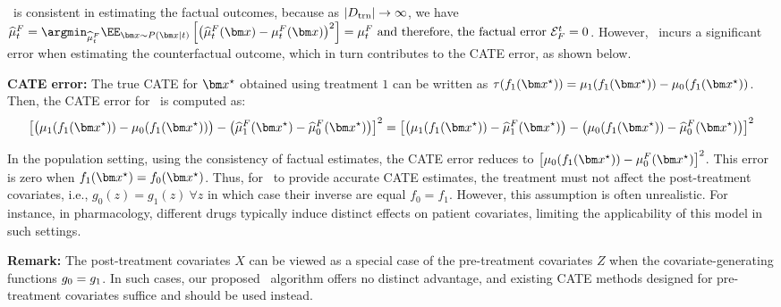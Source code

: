 \realonly\ is consistent in estimating the factual outcomes, because as $|D_{\text{trn}}| \to \infty$, we have
$
     \realmuhat_t^F = \argmin_{\realmuhat^F_t} \EE_{\xb \sim P(\xb|t)}\left[\left(\realmuhat^F_t(\xb) - \realmu^F_t(\xb)\right)^2\right] = \realmu_t^F \text{ and therefore, the factual error } \ErrF^t = 0
$.
However, \realonly\ incurs a significant error when estimating the counterfactual outcome, which in turn contributes to the CATE error, as shown below.



\textbf{CATE error:} The true CATE for $\xb^\star$ obtained using treatment $1$ can be written as $\tau(\RInv_1(\xb^\star)) = \realmu_1(\RInv_1(\xb^\star)) - \realmu_0(\RInv_1(\xb^\star))$. Then, the CATE error for \realonly\ is computed as:
$$
\left[\big(\realmu_1(\RInv_1(\xb^\star)) - \realmu_0(\RInv_1(\xb^\star))\big) - \big( \realmuhat_1^F(\xb^\star) - \realmuhat_0^F(\xb^\star) \big)\right]^2 = \left[\big(\realmu_1(\RInv_1(\xb^\star)) - \realmuhat_1^F(\xb^\star) \big) - \big( \realmu_0(\RInv_1(\xb^\star)) - \realmuhat_0^F(\xb^\star) \big)\right]^2 
$$

In the population setting, using the consistency of factual estimates, the CATE error reduces to $\left[ \realmu_0(\RInv_1(\xb^\star)) - \realmu_0^F(\xb^\star)\right]^2$. This error is zero when $\RInv_1(\xb^\star) = \RInv_0(\xb^\star)$. Thus, for \realonly\ to provide accurate CATE estimates, the treatment must not affect the post-treatment covariates, i.e., $g_0(z) = g_1(z)~ \forall z$ in which case their inverse are equal $f_0 = f_1$. However, this assumption is often unrealistic. For instance, in pharmacology, different drugs typically induce distinct effects on patient covariates, limiting the applicability of this model in such settings.

\textbf{Remark:} The post-treatment covariates $X$ can be viewed as a special case of the pre-treatment covariates $Z$ when the covariate-generating functions $g_0 = g_1$. In such cases, our proposed \our\ algorithm offers no distinct advantage, and existing CATE methods designed for pre-treatment covariates suffice and should be used instead.


